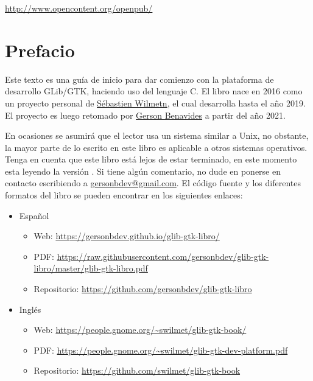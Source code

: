     \url{http://www.opencontent.org/openpub/}

\newpage

\section{Prefacio}

    \noindent
    Este texto es una guía de inicio para dar comienzo con la plataforma de desarrollo GLib/GTK, haciendo uso del lenguaje C. El libro nace en 2016 como un proyecto personal de \href{https://louvilug.tuxfamily.org/swilmet/}{Sébastien Wilmetn}, el cual desarrolla hasta el año 2019. El proyecto es luego retomado por \href{https://gersonbdev.github.io/about/}{Gerson Benavides} a partir del año 2021.
    
    En ocasiones se asumirá que el lector usa un sistema similar a Unix, no obstante, la mayor parte de lo escrito en este libro es aplicable a otros sistemas operativos. Tenga en cuenta que este libro está lejos de estar terminado, en este momento esta leyendo la versión \bookversion. Si tiene algún comentario, no dude en ponerse en contacto escribiendo a \href{mailto:gersonbdev@gmail.com}{gersonbdev@gmail.com}.    El código fuente y los diferentes formatos del libro se pueden encontrar en los siguientes enlaces:
    
    \begin{itemize}
        \item Español
            \begin{itemize}
                \item Web: \url{https://gersonbdev.github.io/glib-gtk-libro/}
                \item PDF: \url{https://raw.githubusercontent.com/gersonbdev/glib-gtk-libro/master/glib-gtk-libro.pdf}
                \item Repositorio: \url{https://github.com/gersonbdev/glib-gtk-libro}
            \end{itemize}
        \item Inglés
            \begin{itemize}
                \item Web: \url{https://people.gnome.org/~swilmet/glib-gtk-book/}
                \item PDF: \url{https://people.gnome.org/~swilmet/glib-gtk-dev-platform.pdf}
                \item Repositorio: \url{https://github.com/swilmet/glib-gtk-book}
            \end{itemize}
    \end{itemize}


